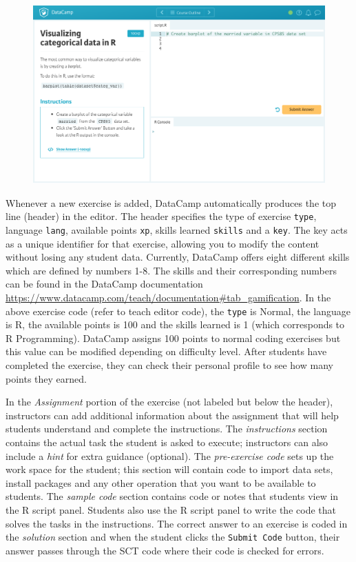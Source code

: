 \documentclass[12pt]{article}\usepackage[]{graphicx}\usepackage[]{color}
\begin{document}
\begin{figure}[h]
  \includegraphics[scale = 0.40] {preview.jpg}
\end{figure}

Whenever a new exercise is added, DataCamp automatically produces the top line (header) in the editor. The header specifies the type
of exercise \texttt{type}, language \texttt{lang}, available points \texttt{xp}, skills learned \texttt{skills} and a \texttt{key}. The key acts as a unique
identifier for that exercise, allowing you to modify the content without losing any student data. Currently, DataCamp offers
eight different skills which are defined by numbers 1-8. The skills and their corresponding numbers can be found in the DataCamp
documentation \url{https://www.datacamp.com/teach/documentation#tab_gamification}. 
In the above exercise code (refer to teach editor code), the \texttt{type} is Normal, the language is R, the available points is 100 and the skills learned is 1 (which 
corresponds to R Programming). DataCamp assigns 100 points to normal coding exercises but this value can be modified depending on
difficulty level. After students have completed the exercise, they can check their personal profile to see how many points they earned.


In the \textit{Assignment} portion of the exercise (not labeled but below the header), instructors can add additional information about the assignment that will help
students understand and complete the instructions. The \textit{instructions} section contains the actual task the student is
asked to execute; instructors can also include a \textit{hint} for extra guidance (optional). The \textit{pre-exercise code} sets up the work space for 
the student; this section will contain code to import data sets, install packages and any other operation that you want to be available to
students. The \textit{sample code} section contains code or notes that students view in the R script panel. Students also use the R script panel to write
the code that solves the tasks in the instructions. The correct answer to an exercise is coded in the \textit{solution} section
and when the student clicks the \texttt{Submit Code} button, their answer passes through the SCT code where their code is checked for errors.
\end{document}
